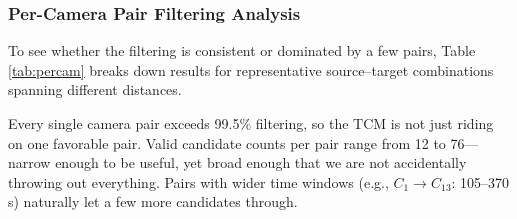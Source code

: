 \documentclass{ijitcs}
\begin{document}
\subsubsection{Per-Camera Pair Filtering Analysis}
To see whether the filtering is consistent or dominated by a few pairs, Table \ref{tab:percam} breaks down results for representative source--target combinations spanning different distances.

\begin{table}[htbp]
\caption{Per-Camera Pair Filtering in Sequential Tracking}
\begin{center}
\label{tab:percam}
\end{center}
\end{table}

Every single camera pair exceeds 99.5\% filtering, so the TCM is not just riding on one favorable pair. Valid candidate counts per pair range from 12 to 76---narrow enough to be useful, yet broad enough that we are not accidentally throwing out everything. Pairs with wider time windows (e.g., $C_1 \rightarrow C_{13}$: 105--370\,s) naturally let a few more candidates through.
\end{document}
